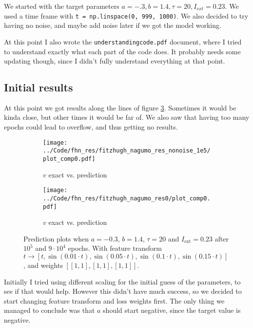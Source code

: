 \documentclass[a4paper]{article}
\begin{document}
We started with the target parameters $a= -.3, b = 1.4, \tau = 20, I_{ext} = 0.23$. We used a time frame with \lstinline|t = np.linspace(0, 999, 1000)|. We also decided to try having no noise, and maybe add noise later if we got the model working. 

At this point I also wrote the \lstinline|understandingcode.pdf| document, where I tried to understand exactly what each part of the code does. It probably needs some updating though, since I didn't fully understand everything at that point. 

\subsection{Initial results}

At this point we got results along the lines of figure \ref{plot:all02}. Sometimes it would be kinda close, but other times it would be far of. We also saw that having too many epochs could lead to overflow, and thus getting no results.

\begin{figure}[H]
	\centering 
	\begin{subfigure}[b]{0.47\textwidth}
		\centering
		\texttt{[image: ../Code/fhn\_res/fitzhugh\_nagumo\_res\_nonoise\_1e5/plot\_comp0.pdf]}
		\caption{$v$ exact vs. prediction}
		\label{fig:all02b}
	\end{subfigure}
	\begin{subfigure}[b]{0.47\textwidth}
		\centering
		\texttt{[image: ../Code/fhn\_res/fitzhugh\_nagumo\_res0/plot\_comp0.pdf]}
		\caption{$v$ exact vs. prediction}
		\label{fig:all02c}
	\end{subfigure}
	\caption{Prediction plots when $a=-0.3$, $b=1.4$, $\tau=20$ and $ I_{\text{ext}}=0.23$ after $10^5$ and $9\cdot10^4$ epochs. With feature transform $t \rightarrow \left[ t, \sin(0.01 \cdot  t), \sin(0.05 \cdot  t), \sin(0.1 \cdot  t), \sin(0.15 \cdot  t)\right] $, and weights $\left[ \left[ 1, 1\right], \left[ 1, 1\right], \left[ 1, 1\right]\right]$.}
	\label{plot:all02}
\end{figure}

Initially I tried using different scaling for the initial guess of the parameters, to see if that would help. However this didn't have much success, so we decided to start changing feature transform and loss weights first. The only thing we managed to conclude was that $a$ should start negative, since the target value is negative.
\end{document}
